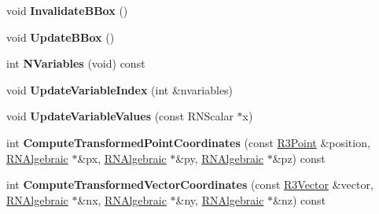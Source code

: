 \begin{DoxyCompactItemize}
\item 
void {\bfseries Invalidate\+B\+Box} ()\hypertarget{struct_f_e_t_shape_a00fff9f2cf100f2216878baa7b188003}{}\label{struct_f_e_t_shape_a00fff9f2cf100f2216878baa7b188003}

\item 
void {\bfseries Update\+B\+Box} ()\hypertarget{struct_f_e_t_shape_a2e43e9eeeed0d4e1653b434cbcbc1f02}{}\label{struct_f_e_t_shape_a2e43e9eeeed0d4e1653b434cbcbc1f02}

\item 
int {\bfseries N\+Variables} (void) const \hypertarget{struct_f_e_t_shape_a044a329119ddd7e10d8adccb5dfbaea3}{}\label{struct_f_e_t_shape_a044a329119ddd7e10d8adccb5dfbaea3}

\item 
void {\bfseries Update\+Variable\+Index} (int \&nvariables)\hypertarget{struct_f_e_t_shape_a3170a1589c8a515d1eba0eeff7ecfe5d}{}\label{struct_f_e_t_shape_a3170a1589c8a515d1eba0eeff7ecfe5d}

\item 
void {\bfseries Update\+Variable\+Values} (const R\+N\+Scalar $\ast$x)\hypertarget{struct_f_e_t_shape_a6f488b6a52f2455e7cc36842ec023c87}{}\label{struct_f_e_t_shape_a6f488b6a52f2455e7cc36842ec023c87}

\item 
int {\bfseries Compute\+Transformed\+Point\+Coordinates} (const \hyperlink{class_r3_point}{R3\+Point} \&position, \hyperlink{class_r_n_algebraic}{R\+N\+Algebraic} $\ast$\&px, \hyperlink{class_r_n_algebraic}{R\+N\+Algebraic} $\ast$\&py, \hyperlink{class_r_n_algebraic}{R\+N\+Algebraic} $\ast$\&pz) const \hypertarget{struct_f_e_t_shape_a433acd5d91496cc13e16599cd9534f2e}{}\label{struct_f_e_t_shape_a433acd5d91496cc13e16599cd9534f2e}

\item 
int {\bfseries Compute\+Transformed\+Vector\+Coordinates} (const \hyperlink{class_r3_vector}{R3\+Vector} \&vector, \hyperlink{class_r_n_algebraic}{R\+N\+Algebraic} $\ast$\&nx, \hyperlink{class_r_n_algebraic}{R\+N\+Algebraic} $\ast$\&ny, \hyperlink{class_r_n_algebraic}{R\+N\+Algebraic} $\ast$\&nz) const \hypertarget{struct_f_e_t_shape_a64ad67b991575775ce1631981a7dc783}{}\label{struct_f_e_t_shape_a64ad67b991575775ce1631981a7dc783}

\end{DoxyCompactItemize}

